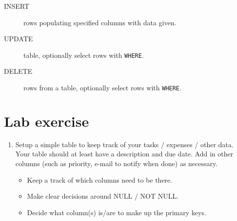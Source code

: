 \documentclass{pgnotes}
\begin{document}
\begin{description}
\item[INSERT]
  rows populating specified columns with data given.
\item[UPDATE]
  table, optionally select rows with \texttt{WHERE}.
\item[DELETE]
  rows from a table, optionally select rows with \texttt{WHERE}.
\end{description}



\section{Lab exercise}

\begin{enumerate}
\def\labelenumi{\arabic{enumi}.}
\item
  Setup a simple table to keep track of your tasks / expenses / other
  data. Your table should at least have a description and due date. Add
  in other columns (such as priority, e-mail to notify when done) as
  necessary.

  \begin{itemize}
  \item
    Keep a track of which columns need to be there.
  \item
    Make clear decisions around NULL / NOT NULL.
  \item
    Decide what column(s) is/are to make up the primary keys.
  \end{itemize}
\end{enumerate}
\end{document}
